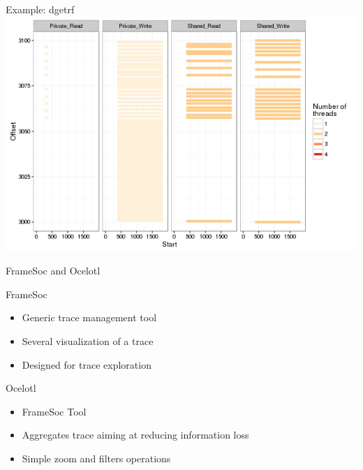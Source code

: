 \documentclass[xcolor={usenames,dvipsnames},hyperref={pdfusetitle}]{beamer}
\begin{document}
\begin{frame}{Example: dgetrf}
{{{            }{
                \includegraphics[width=\textwidth]{labbook-slides/intensity_Share_dgetrf_zoom-init1}
            }
        }
    }
    \pause
    \pause
    \pause
\end{frame}%

\setcounter{framenumber}{\value{finalframe}}
\begin{frame}{FrameSoc and Ocelotl}
    \begin{block}{FrameSoc~\cite{Pagano14frameSoC}}
        \begin{itemize}
            \item Generic trace management tool
            \item Several visualization of a trace
            \item Designed for trace exploration
        \end{itemize}
    \end{block}
    \pause
    \begin{alertblock}{Ocelotl~\cite{Dosimont14Ocelotl}}
        \begin{itemize}
            \item FrameSoc Tool
            \item Aggregates trace aiming at reducing information loss
            \item Simple zoom and filters operations
        \end{itemize}
    \end{alertblock}
\end{frame}
\end{document}
